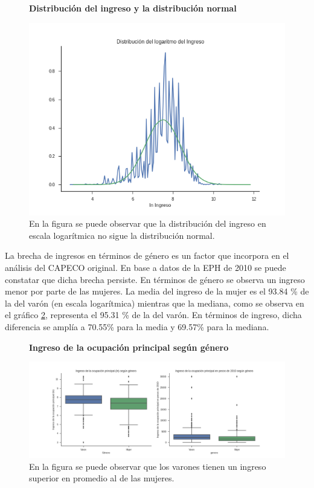 \begin{figure}[!htb]
	\centering
	\textbf{Distribución del ingreso y la distribución normal}\par\medskip
	\includegraphics[scale = 0.5]{../img/capitulo3/kdePlotIngreso3.png}
	\caption{En la figura se puede observar que la distribución del ingreso en escala logarítmica no sigue la distribución normal.}
	\label{fig:kdePlotIngreso3}
\end{figure}

La brecha de ingresos en términos de género es un factor que incorpora en el análisis del CAPECO original. En base a datos de la EPH de 2010 se puede constatar que dicha brecha persiste. En términos de género se observa un ingreso menor por parte de las mujeres. La media del ingreso de la mujer es el 93.84 \% de la del varón (en escala logarítmica) mientras que la mediana, como se observa en el gráfico \ref{fig:ingresoVgenero}, representa el 95.31 \% de la del varón. En términos de ingreso, dicha diferencia se amplía a 70.55\% para la media y 69.57\% para la mediana. 


\begin{figure}[!htb]
	\textbf{Ingreso de la ocupación principal según género}\par\medskip
	\includegraphics[scale = 0.4]{../img/capitulo3/ingresoVgenero.png}
	\caption{En la figura se puede observar que los varones tienen un ingreso superior en promedio al de las mujeres.}
	\label{fig:ingresoVgenero}
\end{figure}


